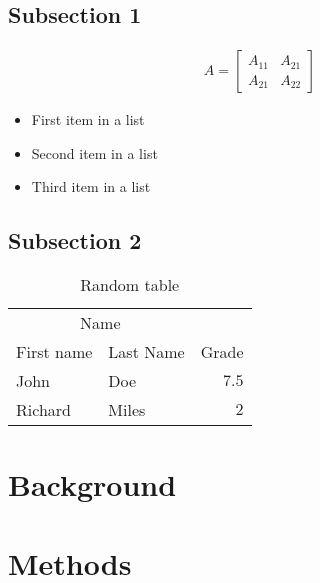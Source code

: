 \documentclass[DIV=calc, paper=a4, fontsize=11pt, twocolumn]{scrartcl}   %
\begin{document}
\lipsum[4] %


\subsection*{Subsection 1}

\lipsum[5] %

\begin{align}
A =
\begin{bmatrix}
A_{11} & A_{21} \\
A_{21} & A_{22}
\end{bmatrix}
\end{align}

\begin{itemize}
\item First item in a list
\item Second item in a list
\item Third item in a list
\end{itemize}

\lipsum[6] %


\subsection*{Subsection 2}

\lipsum[7] %

\begin{table}
\caption{Random table}
\centering
\begin{tabular}{llr}
\toprule
\multicolumn{2}{c}{Name} \\
\cmidrule(r){1-2}
First name & Last Name & Grade \\
\midrule
John & Doe & $7.5$ \\
Richard & Miles & $2$ \\
\bottomrule
\end{tabular}
\end{table}


\section*{Background}

\section*{Methods}
\end{document}
